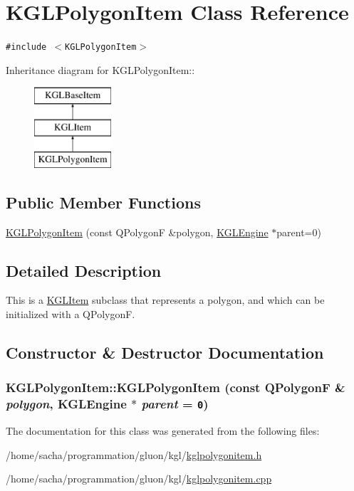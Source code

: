 \hypertarget{class_k_g_l_polygon_item}{
\section{KGLPolygonItem Class Reference}
\label{class_k_g_l_polygon_item}
}
{\tt \#include $<$KGLPolygonItem$>$}

Inheritance diagram for KGLPolygonItem::\begin{figure}[H]
\begin{center}
\leavevmode
\includegraphics[height=3cm]{class_k_g_l_polygon_item}
\end{center}
\end{figure}
\subsection*{Public Member Functions}
\begin{CompactItemize}
\item 
\hyperlink{class_k_g_l_polygon_item_5623294ed1300654c22c960384c39e62}{KGLPolygonItem} (const QPolygonF \&polygon, \hyperlink{class_k_g_l_engine}{KGLEngine} $\ast$parent=0)
\end{CompactItemize}


\subsection{Detailed Description}
This is a \hyperlink{class_k_g_l_item}{KGLItem} subclass that represents a polygon, and which can be initialized with a QPolygonF. 

\subsection{Constructor \& Destructor Documentation}
\hypertarget{class_k_g_l_polygon_item_5623294ed1300654c22c960384c39e62}{
\subsubsection[{KGLPolygonItem}]{\setlength{\rightskip}{0pt plus 5cm}KGLPolygonItem::KGLPolygonItem (const QPolygonF \& {\em polygon}, \/  {\bf KGLEngine} $\ast$ {\em parent} = {\tt 0})}}
\label{class_k_g_l_polygon_item_5623294ed1300654c22c960384c39e62}




The documentation for this class was generated from the following files:\begin{CompactItemize}
\item 
/home/sacha/programmation/gluon/kgl/\hyperlink{kglpolygonitem_8h}{kglpolygonitem.h}\item 
/home/sacha/programmation/gluon/kgl/\hyperlink{kglpolygonitem_8cpp}{kglpolygonitem.cpp}\end{CompactItemize}
